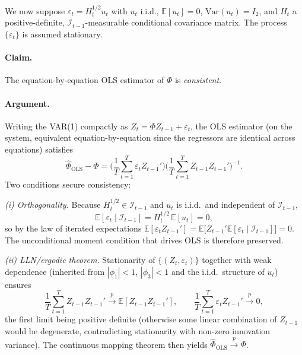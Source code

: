 \documentclass[12pt]{article}
\newcommand{\E}{\mathbb{E}}
\newcommand{\Var}{\mathrm{Var}}
\newcommand{\Info}{\mathcal{I}}
\begin{document}
We now suppose $\varepsilon_t=H_t^{1/2}u_t$ with $u_t$ i.i.d., $\E[u_t]=0$, $\Var(u_t)=I_2$, and $H_t$ a positive-definite, $\Info_{t-1}$-measurable conditional covariance matrix. The process $\{\varepsilon_t\}$ is assumed stationary.

\paragraph{Claim.} The equation-by-equation OLS estimator of $\Phi$ is \emph{consistent}.

\paragraph{Argument.} Writing the VAR(1) compactly as $Z_t = \Phi Z_{t-1}+\varepsilon_t$, the OLS estimator (on the system, equivalent equation-by-equation since the regressors are identical across equations) satisfies
\begin{equation*}
\widehat{\Phi}_{\text{OLS}} - \Phi
= \Bigg(\frac{1}{T}\sum_{t=1}^{T} \varepsilon_t Z_{t-1}'\Bigg)\Bigg(\frac{1}{T}\sum_{t=1}^{T} Z_{t-1}Z_{t-1}'\Bigg)^{-1}.
\end{equation*}
Two conditions secure consistency:

\medskip
\textit{(i) Orthogonality.} Because $H_t^{1/2}\in\Info_{t-1}$ and $u_t$ is i.i.d.\ and independent of $\Info_{t-1}$,
\begin{equation*}
\E[\varepsilon_t\mid\Info_{t-1}] = H_t^{1/2}\,\E[u_t]=0,
\end{equation*}
so by the law of iterated expectations $\E[\varepsilon_t Z_{t-1}']=\E\!\big[Z_{t-1}'\E[\varepsilon_t\mid\Info_{t-1}]\big]=0$. The unconditional moment condition that drives OLS is therefore preserved.

\medskip
\textit{(ii) LLN/ergodic theorem.} Stationarity of $\{(Z_t,\varepsilon_t)\}$ together with weak dependence (inherited from $|\phi_1|<1$, $|\phi_3|<1$ and the i.i.d.\ structure of $u_t$) ensures
\begin{equation*}
\frac{1}{T}\sum_{t=1}^{T}Z_{t-1}Z_{t-1}'\xrightarrow{p}\E[Z_{t-1}Z_{t-1}'],\qquad
\frac{1}{T}\sum_{t=1}^{T}\varepsilon_t Z_{t-1}'\xrightarrow{p}0,
\end{equation*}
the first limit being positive definite (otherwise some linear combination of $Z_{t-1}$ would be degenerate, contradicting stationarity with non-zero innovation variance). The continuous mapping theorem then yields $\widehat{\Phi}_{\text{OLS}}\xrightarrow{p}\Phi$.
\end{document}
